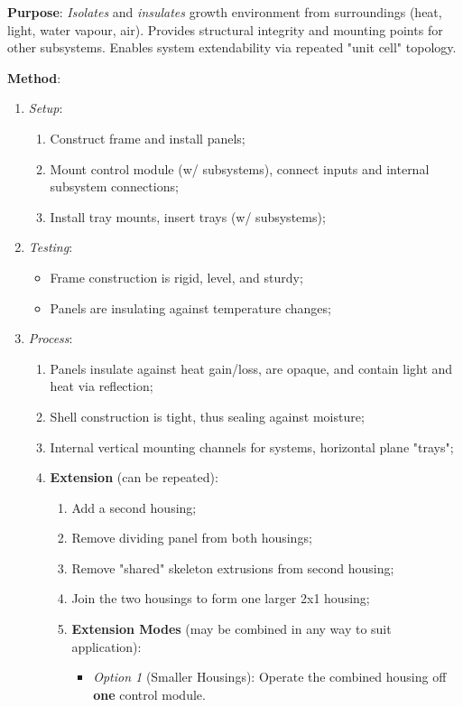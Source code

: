 \documentclass{../tex/report}
\begin{document}
\textbf{Purpose}: \textit{Isolates} and \textit{insulates} growth environment from surroundings (heat, light, water vapour, air). Provides structural integrity and mounting points for other subsystems. Enables system extendability via repeated "unit cell" topology.

\textbf{Method}:
\begin{enumerate}
    \item \textit{Setup}:
    \begin{enumerate}
        \item Construct frame and install panels;
        \item Mount control module (w/ subsystems), connect inputs and internal subsystem connections;
        \item Install tray mounts, insert trays (w/ subsystems);
    \end{enumerate}
    \item \textit{Testing}:
    \begin{itemize}
        \item Frame construction is rigid, level, and sturdy;
        \item Panels are insulating against temperature changes;
    \end{itemize}
    \item \textit{Process}:
    \begin{enumerate}
        \item Panels insulate against heat gain/loss, are opaque, and contain light and heat via reflection;
        \item Shell construction is tight, thus sealing against moisture;
        \item Internal vertical mounting channels for systems, horizontal plane "trays";
        \item \textbf{Extension} (can be repeated):
        \begin{enumerate}
            \item Add a second housing;
            \item Remove dividing panel from both housings;
            \item Remove "shared" skeleton extrusions from second housing;
            \item Join the two housings to form one larger 2x1 housing;
            \item \textbf{Extension Modes} (may be combined in any way to suit application):
            \begin{itemize}
                \item \textit{Option 1} (Smaller Housings): Operate the combined housing off \textbf{one} control module.

\end{itemize}
\end{enumerate}
\end{enumerate}
\end{enumerate}
\end{document}
